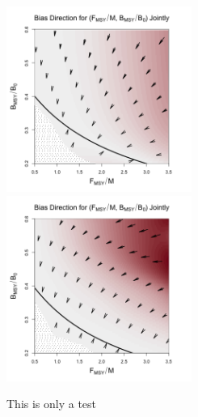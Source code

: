 %
\begin{figure}[h!]
\includegraphics[width=0.54\textwidth]{../ddBias/directionalBiasDDSubExpT45N300AS0.1K10.png} %
\includegraphics[width=0.54\textwidth]{../ddBias/directionalBiasDDSubExpT45N300A0-1AS10K0.1.png} %
\vspace{-1.5cm}
\caption{This is only a test}
\label{rpSpace}
\end{figure}

